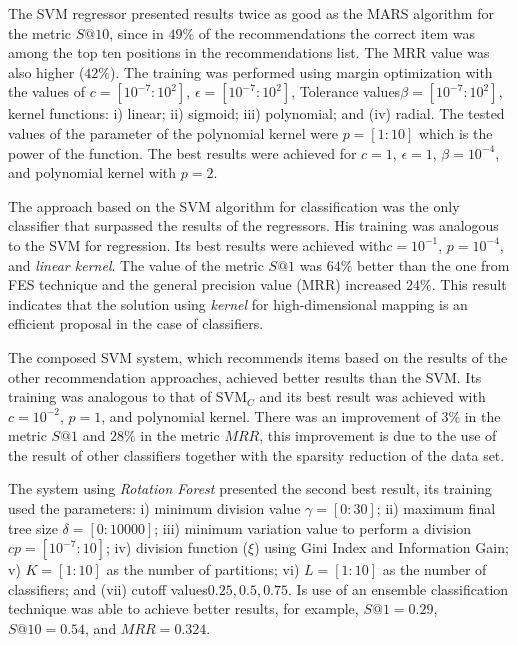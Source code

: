 \documentclass[10pt,letterpaper]{article}
\begin{document}
The SVM regressor presented results twice as good as the MARS algorithm for the metric \(S@10\), since in \(49\%\) of the recommendations the correct item was among the top ten positions in the recommendations list. The MRR value was also higher (\(42\%\)). The training was performed using margin optimization with the values ​​of \(c = [10^{-7}:10^2]\), \(\epsilon = [10^{-7}:10^{2}]\), Tolerance values ​​\(\beta = [10^{-7}:10^{2}]\),  kernel functions: i) linear; ii) sigmoid; iii) polynomial; and (iv) radial. The tested values of the parameter of the polynomial kernel were  \(p = [1:10]\) which is the power of the function. The best results were achieved for \(c = 1\), \(\epsilon = 1\), \(\beta = 10^{-4}\), and polynomial kernel with \(p = 2\). %

The approach based on the SVM algorithm for classification was the only classifier that surpassed the results of the regressors. His training was analogous to the SVM for regression. Its best results were achieved with ​\(c = 10^{-1}\), \(p = 10^{-4}\), and \emph{linear kernel}. The value of the metric \(S@1\) was \(64\%\) better than the one from FES technique and the general precision value (MRR) increased \(24\%\). This result indicates that the solution using \emph{kernel} for high-dimensional mapping is an efficient proposal in the case of classifiers.

The composed SVM system, which recommends items based on the results of the other recommendation approaches, achieved better results than the SVM. Its training was analogous to that of SVM\(_C\) and its best result was achieved with \(c = 10^{-2}\), \(p = 1\), and polynomial kernel. There was an improvement of \(3\%\) in the metric \(S@1\) and \(28\%\) in the metric \(MRR\), this improvement is due to the use of the result of other classifiers together with the sparsity reduction of the data set.

The system using \emph{Rotation Forest} presented the second best result, its training used the parameters: i) minimum division value \(\gamma = [0:30]\); ii) maximum final tree size \(\delta = [0:10000]\); iii) minimum variation value to perform a division \(cp = [10^{-7}:10]\); iv) division function (\(\xi\)) using Gini Index and Information Gain; v) \(K = [1:10]\) as the number of partitions; vi) \(L = [1:10]\) as the number of classifiers; and (vii) cutoff values ​​\(0.25, 0.5, 0.75\). Is use of an ensemble classification technique was able to achieve better results, for example, \(S@1 = 0.29\), \(S@10 = 0.54\), and \(MRR = 0.324\).
\end{document}
